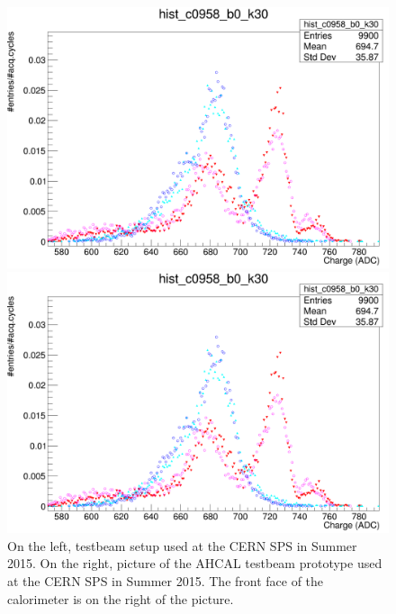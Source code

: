 \begin{figure}[!ht]%
\centering
\vspace{-10px}
\hspace{-100px}
\parbox{1.2in}{
\includegraphics[width=2.5\linewidth, trim={1cm 9cm 3cm 5cm}, clip]{pics/hardware1.png}
}%
\hspace{150px}
\begin{minipage}{1.2in}%
\includegraphics[width=2.2\linewidth]{pics/hardware1.png}
\end{minipage}%
\caption{On the left, testbeam setup used at the CERN SPS in Summer 2015. On the right, picture of the AHCAL testbeam prototype used at the CERN SPS in Summer 2015. The front face of the calorimeter is on the right of the picture.}%
\label{fig:1figs}%
\end{figure}

